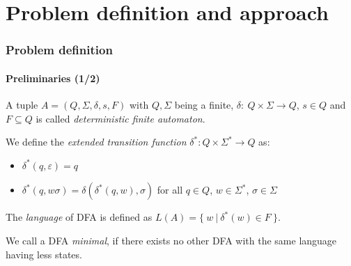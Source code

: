 \documentclass[handout,10pt]{beamer}%
\begin{document}
	
	\section{Problem definition and approach}
	
	\begin{frame}
		\frametitle{Problem definition}
		\framesubtitle{Preliminaries (1/2)}
		
		A tuple $A = (Q, \Sigma, \delta, s, F)$ with $Q, \Sigma$ being a finite, $\delta \colon\ Q \times \Sigma \to Q$, $s \in Q$ and $F \subseteq Q$ is called \emph{deterministic finite automaton}.
		\vspace{0.3cm}
		
		
		We define the \emph{extended transition function} $\delta^* : Q \times \Sigma^* \to Q$ as:
		\begin{itemize}
			\item $\delta^*(q,\varepsilon) = q$
			\item $\delta^*(q,w\sigma) = \delta(\delta^*(q,w),\sigma)$ for all $q \in Q$, $w \in \Sigma^*$, $\sigma \in \Sigma$
		\end{itemize}
		\vspace{0.3cm}
		
		The \emph{language} of DFA is defined as $L(A) = \{\ w\ |\ \delta^*(w) \in F\ \}$.
		\vspace{0.3cm}
		
		We call a DFA \emph{minimal}, if there exists no other DFA with the same language having less states.
	\end{frame}
		
\end{document}
